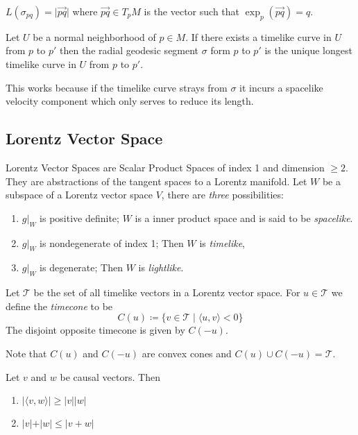 \begin{lemma}
$L(\sigma_{pq}) = \rvert \overrightarrow{pq} \rvert$ where $\overrightarrow{pq}\in T_pM$ is the vector such that $\exp_p(\overrightarrow{pq})=q$.
\end{lemma}

\begin{proposition}
Let $U$ be a normal neighborhood of $p\in M$. If there exists a timelike curve in $U$ from $p$ to $p'$ then the radial geodesic segment $\sigma$ form $p$ to $p'$ is the unique longest timelike curve in $U$ from $p$ to $p'$.
\end{proposition}
This works because if the timelike curve strays from $\sigma$ it incurs a spacelike velocity component which only serves to reduce its length.

\subsection{Lorentz Vector Space}
Lorentz Vector Spaces are Scalar Product Spaces of index 1 and dimension $\ge 2$. They are abstractions of the tangent spaces to a Lorentz manifold.
Let $W$ be a subspace of a Lorentz vector space $V$, there are \emph{three} possibilities:
\begin{enumerate}
    \item $g\vert_W$ is positive definite; $W$ is a inner product space and is said to be \emph{spacelike}.
    \item $g\vert_W$ is nondegenerate of index 1; Then $W$ is \emph{timelike},
    \item $g\vert_W$ is degenerate; Then $W$ is \emph{lightlike}.
\end{enumerate}

\begin{definition}[Timecone]
Let $\mathcal{T}$ be the set of all timelike vectors in a Lorentz vector space.
For $u \in \mathcal{T}$ we define the \emph{timecone} to be
\[
C(u)\coloneqq\{v\in\mathcal{T}\mid\langle u,v\rangle < 0\}
\]
The disjoint opposite timecone is given by $C(-u)$.
\end{definition}
Note that $C(u)$ and $C(-u)$ are convex cones and $C(u) \cup C(-u) = \mathcal{T}$.

\begin{proposition}
Let $v$ and $w$ be causal vectors. Then
\begin{enumerate}
    \item $\vert\langle v,w \rangle\vert\ge \vert v\vert \vert w\vert$
    \item $\vert v \vert + \vert w \vert \le \vert v + w \vert$
\end{enumerate}
\end{proposition}

